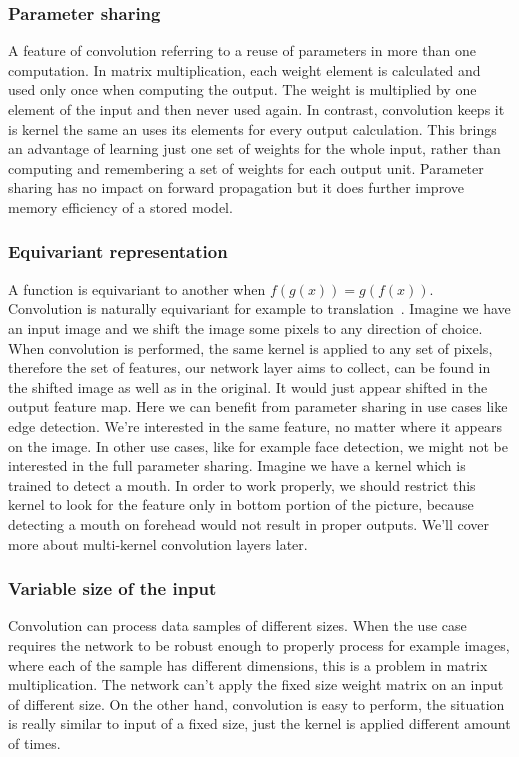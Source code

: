 \subsubsection{Parameter sharing}

A feature of convolution referring to a reuse of parameters in more than one computation. In matrix multiplication, each weight element is calculated and used only once when computing the output. The weight is multiplied by one element of the input and then never used again. In contrast, convolution keeps it is kernel the same an uses its elements for every output calculation. This brings an advantage of learning just one set of weights for the whole input, rather than computing and remembering a set of weights for each output unit. Parameter sharing has no impact on forward propagation but it does further improve memory efficiency of a stored model.

\subsubsection{Equivariant representation}

A function is equivariant to another when $f(g(x)) = g(f(x))$. Convolution is naturally equivariant for example to translation\,\cite[p.~339]{deeplearningbook} . Imagine we have an input image and we shift the image some pixels to any direction of choice. When convolution is performed, the same kernel is applied to any set of pixels, therefore the set of features, our network layer aims to collect, can be found in the shifted image as well as in the original. It would just appear shifted in the output feature map. Here we can benefit from parameter sharing in use cases like edge detection. We're interested in the same feature, no matter where it appears on the image. In other use cases, like for example face detection, we might not be interested in the full parameter sharing. Imagine we have a kernel which is trained to detect a mouth. In order to work properly, we should restrict this kernel to look for the feature only in bottom portion of the picture, because detecting a mouth on forehead would not result in proper outputs. We'll cover more about multi-kernel convolution layers later.

\subsubsection{Variable size of the input}

Convolution can process data samples of different sizes. When the use case requires the network to be robust enough to properly process for example images, where each of the sample has different dimensions, this is a problem in matrix multiplication. The network can't apply the fixed size weight matrix on an input of different size. On the other hand, convolution is easy to perform, the situation is really similar to input of a fixed size, just the kernel is applied different amount of times.

